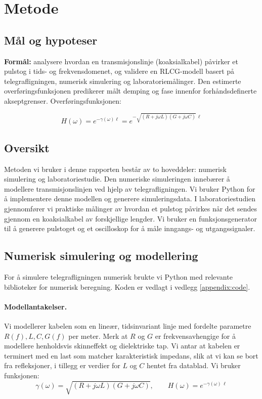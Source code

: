 \section{Metode}

\subsection{Mål og hypoteser}
\textbf{Formål:} analysere hvordan en transmisjonslinje (koaksialkabel) påvirker et pulstog i tids- og frekvensdomenet, og validere en RLCG-modell basert på telegrafligningen, numerisk simulering og laboratoriemålinger. Den estimerte overføringsfunksjonen predikerer målt demping og fase innenfor forhåndsdefinerte akseptgrenser. Overføringsfunksjonen:

\[
H(\omega) = e^{-\gamma(\omega)\ell} = e^{-\sqrt{(R+j\omega L)(G+j\omega C)}\,\ell}
\]

\subsection{Oversikt}
Metoden vi bruker i denne rapporten består av to hoveddeler: numerisk simulering og laboratoriestudie. Den numeriske simuleringen innebærer å modellere transmisjonslinjen ved hjelp av telegrafligningen. Vi bruker Python for å implementere denne modellen og generere simuleringsdata. I laboratoriestudien gjennomfører vi praktiske målinger av hvordan et pulstog påvirkes når det sendes gjennom en koaksialkabel av forskjellige lengder. Vi bruker en funksjonsgenerator til å generere pulstoget og et oscilloskop for å måle inngangs- og utgangssignaler.

\subsection{Numerisk simulering og modellering}
For å simulere telegrafligningen numerisk brukte vi Python med relevante biblioteker for numerisk beregning. Koden er vedlagt i vedlegg \ref{appendix:code}.

\paragraph{Modellantakelser.}
Vi modellerer kabelen som en lineær, tidsinvariant linje med fordelte parametre $R(f),L,C,G(f)$ per meter. Merk at $R$ og $G$ er frekvensavhengige for å modellere henholdsvis skinneffekt og dielektriske tap. Vi antar at kabelen er terminert med en last som matcher karakteristisk impedans, slik at vi kan se bort fra refleksjoner, i tillegg er verdier for $L$ og $C$ hentet fra datablad. Vi bruker funksjonen:
\[
\gamma(\omega)=\sqrt{(R+j\omega L)(G+j\omega C)},\qquad
H(\omega)=e^{-\gamma(\omega)\,\ell}
\]

